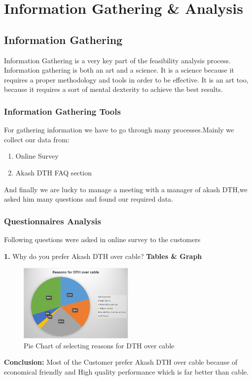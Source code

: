 \chapter{Information Gathering \& Analysis}
\begin{spacing}{1}
\setlength{\parskip}{0.3in}
\graphicspath{{./Chapter3/}}

\section{Information Gathering}
Information Gathering is a very key part of the feasibility analysis process. Information gathering is both an art and a science. It is a science because it requires a proper methodology and tools in order to be effective. It is an art too, because it requires a sort of mental dexterity to achieve the best results.

\subsection{Information Gathering Tools}
For gathering information we have to go through many processes.Mainly we collect our data from:
\begin{enumerate}
\item Online Survey
\item Akash DTH FAQ section 
\end{enumerate}
And finally we are lucky to manage a meeting with a manager of akash DTH,we asked him many questions and found our required data.

\subsection{Questionnaires Analysis}
Following questions were asked in online survey to the customers 

{\bf 1.} Why do you prefer Akash DTH over cable?\newline
{\bf Tables \& Graph}
\begin{figure}[H]
	\centering
	\includegraphics[width=0.5\textwidth]{fig1}
	\caption{Pie Chart of selecting reasons for DTH over cable}
	\label{fig:PieChart1}
\end{figure}
{\bf Conclusion:}\newline
Most of the Customer prefer Akash DTH over cable because of economical friendly and High quality performance which is far better than cable.


\end{spacing}
